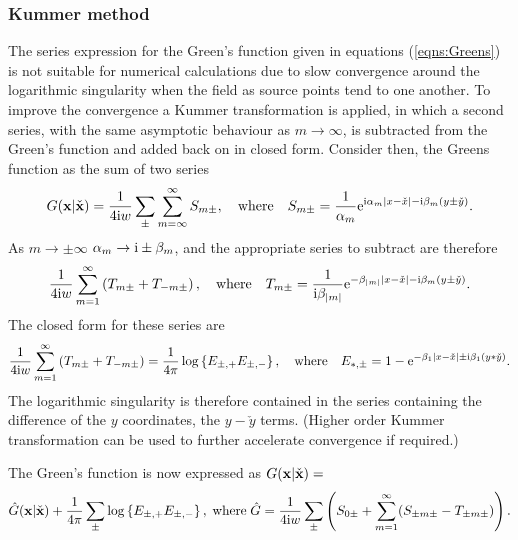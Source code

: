 \documentclass[12pt,a4paper]{article}
\newcommand{\xo}{\check{x}}
\newcommand{\yo}{\check{y}}
\newcommand{\bx}{{\bf x}}
\newcommand{\bxo}{\check{\textbf{x}}}
\begin{document}
%

\subsubsection{Kummer method}

The series expression for the Green's function given in equations (\ref{eqns:Greens}) is not suitable for numerical calculations due to slow convergence around the logarithmic singularity when the field as source points tend to one another.
To improve the convergence a Kummer transformation is applied, in which a second series, with the same asymptotic behaviour as $m\to\infty$, is subtracted from the Green's function and added back on in closed form.
Consider then, the Greens function as the sum of two series 
\begin{equation}
G(\bx\vert\bxo)
=
\frac{1}{4\ci w}
\sum_{\pm}
\sum_{m=\infty}^{\infty}S_{m\pm},
\quad
\text{where}
\quad
S_{m\pm}
=
\frac{1}{\alpha_{m}}
\exp^{\ci\alpha_{m}\vert x-\xo\vert - \ci\beta_{m}(y\pm\yo)}
.
\end{equation}
As $m\to\pm\infty$ $\alpha_{m}\to{\mathrm i}\pm\beta_{m}$, and
the appropriate series to subtract are therefore
\begin{equation}
\frac{1}{4\ci w}
\sum_{m=1}^{\infty}
\left(
T_{m\pm}
+
T_{-m\pm}
\right)
,
\quad
\text{where}
\quad
T_{m\pm}
=
\frac{1}{\ci\beta_{\vert m \vert}}
\exp^{-\beta_{\vert m\vert}\vert x-\xo\vert - \ci\beta_{m}(y\pm\yo)}.
\end{equation}
The closed form for these series are
\begin{equation}\nonumber
\frac{1}{4\ci w}
\sum_{m=1}^{\infty}
\left(
T_{m\pm}
+
T_{-m\pm}
\right)
=
\frac{1}{4\pi}
\log\left\{
E_{\pm,+}
E_{\pm,-}
\right\},
\quad
\text{where}
\quad
E_{\ast,\pm}
=
1-\exp^{-\beta_{1}\vert x-\xo\vert \pm\ci\beta_{1}(y\ast\yo)}
.
\end{equation}
The logarithmic singularity is therefore contained in the series containing the difference of the $y$ coordinates, \ie the $y-\yo$ terms.
(Higher order Kummer transformation can be used to further accelerate convergence if required.)

The Green's function is now expressed as $G(\bx\vert\bxo)=$
\begin{equation}\nonumber
\hat{G}(\bx\vert\bxo)
+
\frac{1}{4\pi}
\sum_{\pm}
\log\left\{
E_{\pm,+}
E_{\pm,-}
\right\},
\;
\text{where}
\;
\hat{G}
=
\frac{1}{4\ci w}
\sum_{\pm}
\left(
S_{0\pm}
+
\sum_{m=1}^{\infty}
(S_{\pm m\pm}-T_{\pm m\pm})
\right).
\end{equation}
\end{document}
